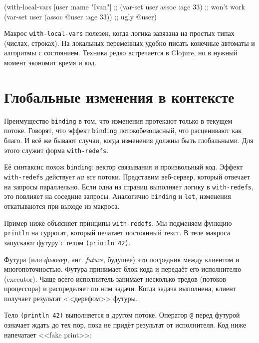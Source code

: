 \begin{english}
  \begin{clojure}
(with-local-vars [user {:name "Ivan"}]
  ;; (var-set user assoc :age 33) ;; won't work
  (var-set user (assoc @user :age 33)) ;; ugly
  @user)
  \end{clojure}
\end{english}

Макрос \verb|with-local-vars| полезен, когда логика завязана на простых типах
(числах, строках). На локальных переменных удобно писать конечные автоматы и
алгоритмы с состоянием. Техника редко встречается в Clojure, но в нужный момент
экономит время и код.

\section{Глобальные изменения в контексте}


\label{with-redefs}

Преимущество \verb|binding| в том, что изменения протекают только в текущем
потоке. Говорят, что эффект \verb|binding| потокобезопасный, что расценивают
как благо. И всё же бывают случаи, когда изменения должны быть глобальными. Для
этого служит форма \verb|with-redefs|.

Её синтаксис похож \verb|binding|: вектор связывания и произвольный
код. Эффект \verb|with-redefs| действует \emph{на все} потоки. Представим
веб-сервер, который отвечает на запросы параллельно. Если одна из страниц
выполняет логику в \verb|with-redefs|, это повлияет на соседние
запросы. Аналогично \verb|binding| и \verb|let|, изменения откатываются при
выходе из макроса.

Пример ниже объясняет принципы \verb|with-redefs|. Мы подменяем функцию
\verb|println| на суррогат, который печатает постоянный текст. В теле макроса
запускают футуру с телом \verb|(println 42)|.


Футура (или \emph{фьючер}, анг. \emph{future}, будущее) это посредник между
клиентом и многопоточностью. Футура принимает блок кода и передаёт его
исполнителю (executor). Чаще всего исполнитель занимает несколько тредов
(потоков процессора) и распределяет по ним задачи. Когда задача выполнена,
клиент получает результат <<дерефом>> футуры.

Тело \verb|(println 42)| выполняется в другом потоке. Оператор \verb|@|
перед футурой означает ждать до тех пор, пока не придёт результат от
исполнителя. Код ниже напечатает <<fake print>>:


